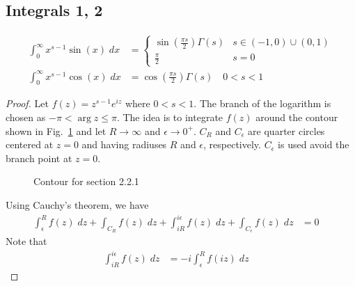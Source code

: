 \subsection{Integrals 1, 2}
\begin{align*}
\int_0^\infty x^{s-1} \sin(x) \; dx &= \begin{cases} \sin\left(\frac{\pi s}{2}\right)\Gamma(s) & s\in (-1,0)\cup (0,1) \\ \frac{\pi}{2} &  s=0 \end{cases}\\
\int_0^\infty x^{s-1} \cos(x) \; dx &= \cos\left(\frac{\pi s}{2}\right)\Gamma(s) \quad 0<s < 1
\end{align*}
\begin{proof}
Let $f(z) = z^{s-1} e^{iz}$ where $0<s<1$. The branch of the logarithm is chosen as $-\pi < \arg z \leq \pi$. The idea is to integrate $f(z)$ around the contour shown in Fig.~\ref{c1} and let $R\to \infty$ and $\epsilon\to 0^+$. $C_R$ and $C_\epsilon$ are quarter circles centered at $z=0$ and having radiuses $R$ and $\epsilon$, respectively. $C_\epsilon$ is used avoid the branch point at $z=0$. 
\begin{figure}[h]
\centering
{}
\caption{Contour for section 2.2.1}
\label{c1}
\end{figure}
Using Cauchy's theorem, we have
\begin{align*}
\int_\epsilon^R f(z) \; dz + \int_{C_R} f(z) \; dz + \int_{iR}^{i\epsilon} f(z) \; dz + \int_{C_\epsilon}f(z)\; dz &= 0 \quad \tag{1}
\end{align*}
Note that
\begin{align*}
\int_{iR}^{i\epsilon}f(z)\; dz &= -i \int_\epsilon^R f(iz)\; dz \quad \tag{2}
\end{align*}

\end{proof}
